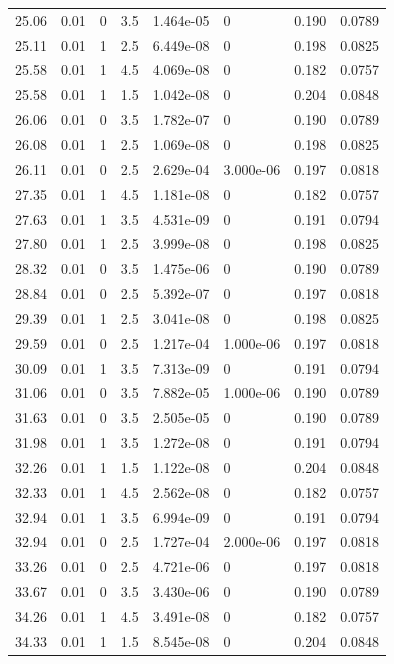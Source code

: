 \documentclass[preview]{standalone}
\begin{document}
{{{\begin{tabular}{L{1.2cm}C{1.2cm} C{0.3cm}C{0.5cm} C{1.4cm}C{1.4cm} C{1.4cm}C{1.4cm}}
  25.06  &  0.01  & 0     & 3.5 &  1.464e-05  & 0  & 0.190 &  0.0789   \\ 
  25.11  &  0.01  & 1     & 2.5 &  6.449e-08  & 0  & 0.198 &  0.0825   \\ 
  25.58  &  0.01  & 1     & 4.5 &  4.069e-08  & 0  & 0.182 &  0.0757   \\ 
  25.58  &  0.01  & 1     & 1.5 &  1.042e-08  & 0  & 0.204 &  0.0848   \\ 
  26.06  &  0.01  & 0     & 3.5 &  1.782e-07  & 0  & 0.190 &  0.0789   \\ 
  26.08  &  0.01  & 1     & 2.5 &  1.069e-08  & 0  & 0.198 &  0.0825   \\ 
  26.11  &  0.01  & 0     & 2.5 &  2.629e-04  & 3.000e-06  & 0.197 &  0.0818   \\ 
  27.35  &  0.01  & 1     & 4.5 &  1.181e-08  & 0  & 0.182 &  0.0757   \\ 
  27.63  &  0.01  & 1     & 3.5 &  4.531e-09  & 0  & 0.191 &  0.0794   \\ 
  27.80  &  0.01  & 1     & 2.5 &  3.999e-08  & 0  & 0.198 &  0.0825   \\ 
  28.32  &  0.01  & 0     & 3.5 &  1.475e-06  & 0  & 0.190 &  0.0789   \\ 
  28.84  &  0.01  & 0     & 2.5 &  5.392e-07  & 0  & 0.197 &  0.0818   \\ 
  29.39  &  0.01  & 1     & 2.5 &  3.041e-08  & 0  & 0.198 &  0.0825   \\ 
  29.59  &  0.01  & 0     & 2.5 &  1.217e-04  & 1.000e-06  & 0.197 &  0.0818   \\ 
  30.09  &  0.01  & 1     & 3.5 &  7.313e-09  & 0  & 0.191 &  0.0794   \\ 
  31.06  &  0.01  & 0     & 3.5 &  7.882e-05  & 1.000e-06  & 0.190 &  0.0789   \\ 
  31.63  &  0.01  & 0     & 3.5 &  2.505e-05  & 0  & 0.190 &  0.0789   \\ 
  31.98  &  0.01  & 1     & 3.5 &  1.272e-08  & 0  & 0.191 &  0.0794   \\ 
  32.26  &  0.01  & 1     & 1.5 &  1.122e-08  & 0  & 0.204 &  0.0848   \\ 
  32.33  &  0.01  & 1     & 4.5 &  2.562e-08  & 0  & 0.182 &  0.0757   \\ 
  32.94  &  0.01  & 1     & 3.5 &  6.994e-09  & 0  & 0.191 &  0.0794   \\ 
  32.94  &  0.01  & 0     & 2.5 &  1.727e-04  & 2.000e-06  & 0.197 &  0.0818   \\ 
  33.26  &  0.01  & 0     & 2.5 &  4.721e-06  & 0  & 0.197 &  0.0818   \\ 
  33.67  &  0.01  & 0     & 3.5 &  3.430e-06  & 0  & 0.190 &  0.0789   \\ 
  34.26  &  0.01  & 1     & 4.5 &  3.491e-08  & 0  & 0.182 &  0.0757   \\ 
  34.33  &  0.01  & 1     & 1.5 &  8.545e-08  & 0  & 0.204 &  0.0848   \\ 
\hline 
\end{tabular} 

}}}
\end{document}
